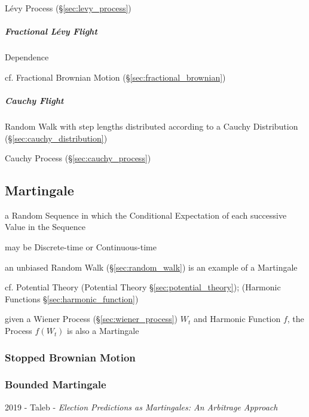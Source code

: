 \fist L\'evy Process (\S\ref{sec:levy_process})



\subparagraph{Fractional L\'evy Flight}\label{sec:fractional_levy}\hfill

Dependence

\fist cf. Fractional Brownian Motion (\S\ref{sec:fractional_brownian})



\subparagraph{Cauchy Flight}\label{sec:cauchy_flight}\hfill

Random Walk with step lengths distributed according to a Cauchy Distribution
(\S\ref{sec:cauchy_distribution})

\fist Cauchy Process (\S\ref{sec:cauchy_process})



\subsection{Martingale}\label{sec:martingale}

a Random Sequence in which the Conditional Expectation of each successive Value
in the Sequence

may be Discrete-time or Continuous-time

an unbiased Random Walk (\S\ref{sec:random_walk}) is an example of a Martingale

\fist cf. Potential Theory (Potential Theory \S\ref{sec:potential_theory});
(Harmonic Functions \S\ref{sec:harmonic_function})

given a Wiener Process (\S\ref{sec:wiener_process}) $W_t$ and Harmonic Function
$f$, the Process $f(W_t)$ is also a Martingale



\subsubsection{Stopped Brownian Motion}\label{sec:stopped_brownian_motion}

\subsubsection{Bounded Martingale}\label{sec:bounded_martingale}

2019 - Taleb - \emph{Election Predictions as Martingales: An Arbitrage Approach}



